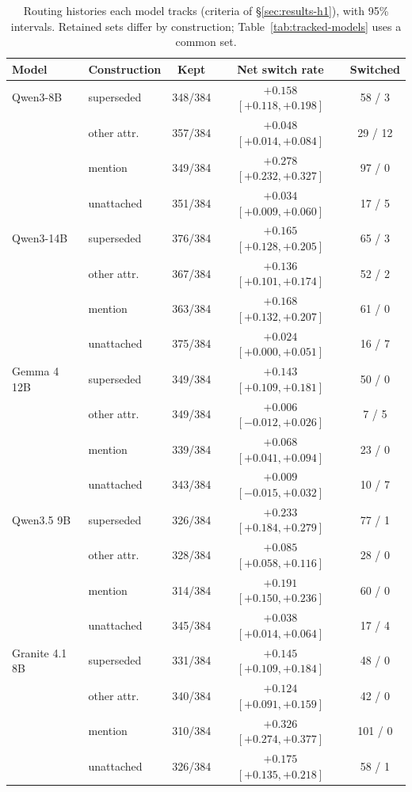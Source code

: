 \begin{table}[t]
\centering
\small
\setlength{\tabcolsep}{5pt}
\begin{tabular}{@{}llccc@{}}
\toprule
Model & Construction & Kept & Net switch rate & Switched \\
\midrule
Qwen3-8B & superseded & 348/384 & $+0.158$ $[+0.118, +0.198]$ & 58 / 3 \\
 & other attr. & 357/384 & $+0.048$ $[+0.014, +0.084]$ & 29 / 12 \\
 & mention & 349/384 & $+0.278$ $[+0.232, +0.327]$ & 97 / 0 \\
 & unattached & 351/384 & $+0.034$ $[+0.009, +0.060]$ & 17 / 5 \\
\midrule
Qwen3-14B & superseded & 376/384 & $+0.165$ $[+0.128, +0.205]$ & 65 / 3 \\
 & other attr. & 367/384 & $+0.136$ $[+0.101, +0.174]$ & 52 / 2 \\
 & mention & 363/384 & $+0.168$ $[+0.132, +0.207]$ & 61 / 0 \\
 & unattached & 375/384 & $+0.024$ $[+0.000, +0.051]$ & 16 / 7 \\
\midrule
Gemma 4 12B & superseded & 349/384 & $+0.143$ $[+0.109, +0.181]$ & 50 / 0 \\
 & other attr. & 349/384 & $+0.006$ $[-0.012, +0.026]$ & 7 / 5 \\
 & mention & 339/384 & $+0.068$ $[+0.041, +0.094]$ & 23 / 0 \\
 & unattached & 343/384 & $+0.009$ $[-0.015, +0.032]$ & 10 / 7 \\
\midrule
Qwen3.5 9B & superseded & 326/384 & $+0.233$ $[+0.184, +0.279]$ & 77 / 1 \\
 & other attr. & 328/384 & $+0.085$ $[+0.058, +0.116]$ & 28 / 0 \\
 & mention & 314/384 & $+0.191$ $[+0.150, +0.236]$ & 60 / 0 \\
 & unattached & 345/384 & $+0.038$ $[+0.014, +0.064]$ & 17 / 4 \\
\midrule
Granite 4.1 8B & superseded & 331/384 & $+0.145$ $[+0.109, +0.184]$ & 48 / 0 \\
 & other attr. & 340/384 & $+0.124$ $[+0.091, +0.159]$ & 42 / 0 \\
 & mention & 310/384 & $+0.326$ $[+0.274, +0.377]$ & 101 / 0 \\
 & unattached & 326/384 & $+0.175$ $[+0.135, +0.218]$ & 58 / 1 \\
\bottomrule
\end{tabular}
\caption{Routing histories each model tracks (criteria of \S\ref{sec:results-h1}), with 95\% intervals. Retained sets differ by construction; Table~\ref{tab:tracked-models} uses a common set.}
\label{tab:joint-by-model}
\end{table}
